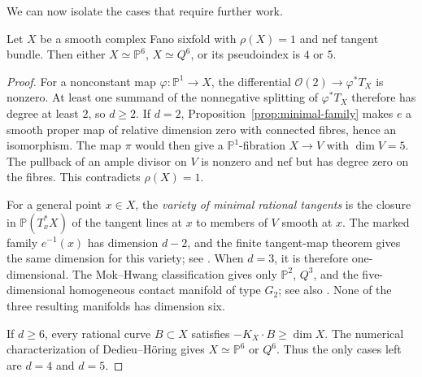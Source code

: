 We can now isolate the cases that require further work.

\begin{proposition}\label{prop:pseudoindex-reduction}
Let $X$ be a smooth complex Fano sixfold with $\rho(X)=1$ and nef tangent
bundle.  Then either $X\simeq\mathbb P^6$, $X\simeq Q^6$, or its
pseudoindex is $4$ or $5$.
\end{proposition}

\begin{proof}
For a nonconstant map $\varphi:\mathbb P^1\to X$, the differential
$\mathcal O(2)\to\varphi^*T_X$ is nonzero.  At least one summand of the
nonnegative splitting of $\varphi^*T_X$ therefore has degree at least
$2$, so $d\geq2$.
If $d=2$, Proposition~\ref{prop:minimal-family} makes $e$ a smooth proper
map of relative dimension zero with connected fibres, hence an
isomorphism.  The map $\pi$ would then give a $\mathbb P^1$-fibration
$X\to V$ with $\dim V=5$.  The pullback of an ample divisor on $V$ is
nonzero and nef but has degree zero on the fibres.  This contradicts
$\rho(X)=1$.

For a general point $x\in X$, the \emph{variety of minimal rational
tangents} is the closure in $\mathbb P(T_x^*X)$ of the tangent lines at
$x$ to members of $V$ smooth at $x$.  The marked family $e^{-1}(x)$ has
dimension $d-2$, and the finite tangent-map theorem gives the same
dimension for this variety; see \cite[Theorem~3.4]{Kebekus2002}.
When $d=3$, it is therefore one-dimensional.  The Mok--Hwang classification
\cite[Theorem~15]{Mok2008} gives only $\mathbb P^2$, $Q^3$, and the
five-dimensional homogeneous contact manifold of type $G_2$; see also
\cite[Section~1]{Kanemitsu2017}.
None of the three resulting manifolds has dimension six.

If $d\geq6$, every rational curve $B\subset X$ satisfies
$-K_X\cdot B\geq\dim X$.  The numerical characterization of
Dedieu--H\"oring \cite[Theorem~1.3]{DedieuHoring2017} gives
$X\simeq\mathbb P^6$ or $Q^6$.
Thus the only cases left are $d=4$ and $d=5$.
\end{proof}
